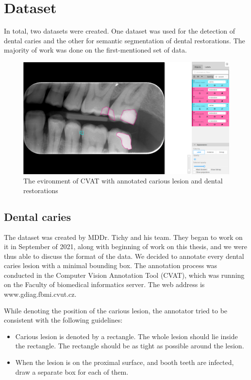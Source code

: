 \chapter{Dataset}
In total, two datasets were created. One dataset was used for the detection of dental caries and the other for semantic segmentation of dental restorations. The majority of work was done on the first-mentioned set of data.

\begin{figure}
    \centering
    \includegraphics[width=\linewidth]{images/cvat.png}
    \caption{The evironment of CVAT with annotated carious lesion and dental restorations}
    \label{fig:cvat}
\end{figure}

\section{Dental caries}
The dataset was created by MDDr. Tichy and his team. They began to work on it in September of 2021, along with beginning of work on this thesis, and we were thus able to discuss the format of the data. We decided to annotate every dental caries lesion with a minimal bounding box. The annotation process was conducted in the Computer Vision Annotation Tool (CVAT), which was running on the Faculty of biomedical informatics server. The web address is www.gdiag.fbmi.cvut.cz.

While denoting the position of the carious lesion, the annotator tried to be consistent with the following guidelines:

\begin{itemize}
    \item Carious lesion is denoted by a rectangle. The whole lesion should lie inside the rectangle. The rectangle should be as tight as possible around the lesion.
    \item When the lesion is on the proximal surface, and booth teeth are infected, draw a separate box for each of them.
\end{itemize}

